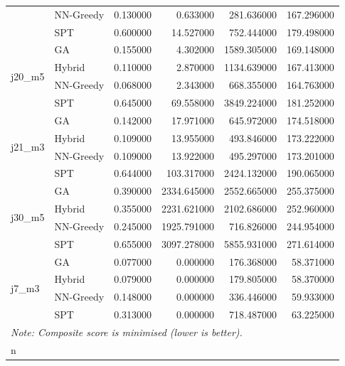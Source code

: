 \begin{tabular}{llrrrr}
 & NN-Greedy & 0.130000 & 0.633000 & 281.636000 & 167.296000 \\
 & SPT & 0.600000 & 14.527000 & 752.444000 & 179.498000 \\
\cline{1-6}
\multirow[t]{4}{*}{j20_m5} & GA & 0.155000 & 4.302000 & 1589.305000 & 169.148000 \\
 & Hybrid & 0.110000 & 2.870000 & 1134.639000 & 167.413000 \\
 & NN-Greedy & 0.068000 & 2.343000 & 668.355000 & 164.763000 \\
 & SPT & 0.645000 & 69.558000 & 3849.224000 & 181.252000 \\
\cline{1-6}
\multirow[t]{4}{*}{j21_m3} & GA & 0.142000 & 17.971000 & 645.972000 & 174.518000 \\
 & Hybrid & 0.109000 & 13.955000 & 493.846000 & 173.222000 \\
 & NN-Greedy & 0.109000 & 13.922000 & 495.297000 & 173.201000 \\
 & SPT & 0.644000 & 103.317000 & 2424.132000 & 190.065000 \\
\cline{1-6}
\multirow[t]{4}{*}{j30_m5} & GA & 0.390000 & 2334.645000 & 2552.665000 & 255.375000 \\
 & Hybrid & 0.355000 & 2231.621000 & 2102.686000 & 252.960000 \\
 & NN-Greedy & 0.245000 & 1925.791000 & 716.826000 & 244.954000 \\
 & SPT & 0.655000 & 3097.278000 & 5855.931000 & 271.614000 \\
\cline{1-6}
\multirow[t]{4}{*}{j7_m3} & GA & 0.077000 & 0.000000 & 176.368000 & 58.371000 \\
 & Hybrid & 0.079000 & 0.000000 & 179.805000 & 58.370000 \\
 & NN-Greedy & 0.148000 & 0.000000 & 336.446000 & 59.933000 \\
 & SPT & 0.313000 & 0.000000 & 718.487000 & 63.225000 \\
\cline{1-6}
\bottomrule
\multicolumn{5}{l}{\small\textit{Note: Composite score is minimised (lower is better).}}\\n
\end{tabular}
